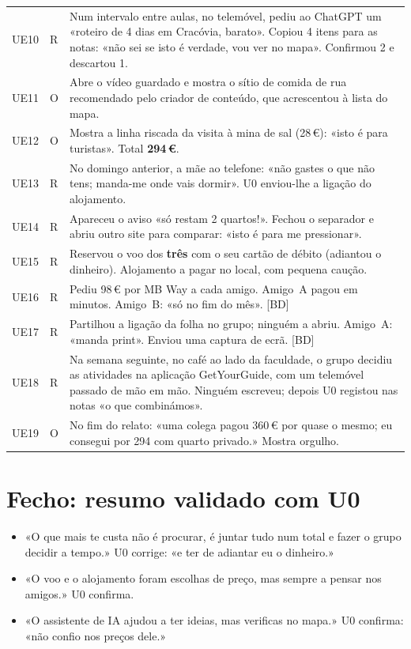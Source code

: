 \documentclass[11pt,a4paper]{article}
\newcommand{\bolt}{\textcolor{alerta}{[BD]}}
\begin{document}
{\begin{longtable}{@{}p{1.1cm}p{0.7cm}p{13.4cm}@{}}
UE10 & R & Num intervalo entre aulas, no telemóvel, pediu ao ChatGPT um 
«roteiro de 4 dias em Cracóvia, barato». Copiou 4 itens para as notas: «não sei se 
isto é verdade, vou ver no mapa». Confirmou 2 e descartou 1. \\

UE11 & O & Abre o vídeo guardado e mostra o sítio de comida de rua recomendado 
pelo criador de conteúdo, que acrescentou à lista do mapa. \\

UE12 & O & Mostra a linha riscada da visita à mina de sal (28\,€): «isto é para 
turistas». Total \textbf{294\,€}. \\

UE13 & R & No domingo anterior, a mãe ao telefone: «não gastes o que não tens; 
manda-me onde vais dormir». U0 enviou-lhe a ligação do alojamento. \\

UE14 & R & Apareceu o aviso «só restam 2 quartos!». Fechou o separador e abriu 
outro site para comparar: «isto é para me pressionar». \\

UE15 & R & Reservou o voo dos \textbf{três} com o seu cartão de débito (adiantou 
o dinheiro). Alojamento a pagar no local, com pequena caução. \\

UE16 & R & Pediu 98\,€ por MB Way a cada amigo. Amigo~A pagou em minutos. Amigo~B: 
«só no fim do mês». \bolt{} \\

UE17 & R & Partilhou a ligação da folha no grupo; ninguém a abriu. Amigo~A: 
«manda print». Enviou uma captura de ecrã. \bolt{} \\

UE18 & R & Na semana seguinte, no café ao lado da faculdade, o grupo decidiu as
atividades na aplicação GetYourGuide, com um telemóvel passado de mão em mão. Ninguém escreveu; 
depois U0 registou nas notas «o que combinámos». \\

UE19 & O & No fim do relato: «uma colega pagou 360\,€ por quase o mesmo; eu 
consegui por 294 com quarto privado.» Mostra orgulho. \\
\bottomrule
\end{longtable}}

\section{Fecho: resumo validado com U0}
\begin{itemize}
  \item «O que mais te custa não é procurar, é juntar tudo num total e 
  fazer o grupo decidir a tempo.» U0 corrige: «e ter de adiantar eu o dinheiro.»
  \item «O voo e o alojamento foram escolhas de preço, mas sempre a pensar nos 
  amigos.» U0 confirma.
  \item «O assistente de IA ajudou a ter ideias, mas verificas no mapa.» 
  U0 confirma: «não confio nos preços dele.»
\end{itemize}
\end{document}

